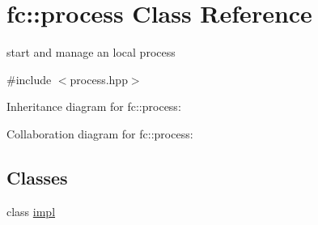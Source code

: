 \hypertarget{classfc_1_1process}{}\section{fc\+:\+:process Class Reference}
\label{classfc_1_1process}


start and manage an local process  




{\ttfamily \#include $<$process.\+hpp$>$}



Inheritance diagram for fc\+:\+:process\+:


Collaboration diagram for fc\+:\+:process\+:
\subsection*{Classes}
\begin{DoxyCompactItemize}
\item 
class \mbox{\hyperlink{classfc_1_1process_1_1impl}{impl}}
\end{DoxyCompactItemize}
